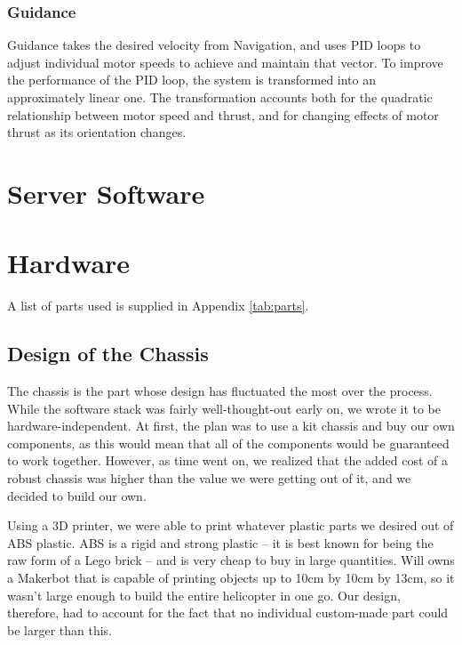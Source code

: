 \documentclass[letterpaper]{article}
\begin{document}
\subsubsection{Guidance}
Guidance takes the desired velocity from Navigation,‭ ‬and uses PID
loops to adjust individual motor speeds to achieve and maintain that
vector.‭  ‬To improve the performance of the PID loop,‭ ‬the system is
transformed into an approximately linear one.‭  ‬The transformation
accounts both for the quadratic relationship between motor speed and
thrust,‭ ‬and for changing effects of motor thrust as its orientation
changes.

\section{Server Software}

\section{Hardware}
A list of parts used is supplied in Appendix \ref{tab:parts}.

\subsection{Design of the Chassis}
The chassis is the part whose design has fluctuated the most over the
process. While the software stack was fairly well-thought-out early
on, we wrote it to be hardware-independent. At first, the plan was to
use a kit chassis and buy our own components, as this would mean that
all of the components would be guaranteed to work together. However,
as time went on, we realized that the added cost of a robust chassis
was higher than the value we were getting out of it, and we decided to
build our own.

Using a 3D printer, we were able to print whatever plastic parts we
desired out of ABS plastic. ABS is a rigid and strong plastic -- it is
best known for being the raw form of a Lego brick -- and is very cheap
to buy in large quantities. Will owns a Makerbot that is capable of
printing objects up to 10cm by 10cm by 13cm, so it wasn't large enough
to build the entire helicopter in one go. Our design, therefore, had
to account for the fact that no individual custom-made part could be
larger than this.
\end{document}
